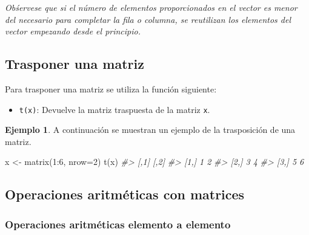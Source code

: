 \documentclass[
]{book}
\newenvironment{Shaded}{\begin{snugshade}}{\end{snugshade}}
\newcommand{\AttributeTok}[1]{\textcolor[rgb]{0.77,0.63,0.00}{#1}}
\newcommand{\CommentTok}[1]{\textcolor[rgb]{0.56,0.35,0.01}{\textit{#1}}}
\newcommand{\DecValTok}[1]{\textcolor[rgb]{0.00,0.00,0.81}{#1}}
\newcommand{\FunctionTok}[1]{\textcolor[rgb]{0.00,0.00,0.00}{#1}}
\newcommand{\NormalTok}[1]{#1}
\newcommand{\OtherTok}[1]{\textcolor[rgb]{0.56,0.35,0.01}{#1}}
\newcommand{\SpecialCharTok}[1]{\textcolor[rgb]{0.00,0.00,0.00}{#1}}
\providecommand{\tightlist}{%
  \setlength{\itemsep}{0pt}\setlength{\parskip}{0pt}}
\theoremstyle{definition}
\theoremstyle{definition}
\newtheorem{example}{Ejemplo}[chapter]
\theoremstyle{definition}
\theoremstyle{definition}
\theoremstyle{remark}
\begin{document}
\emph{Obśervese que si el número de elementos proporcionados en el vector es menor del necesario para completar la fila o columna, se reutilizan los elementos del vector empezando desde el principio.}

\hypertarget{trasponer-una-matriz}{%
\subsection{Trasponer una matriz}\label{trasponer-una-matriz}}

Para trasponer una matriz se utiliza la función siguiente:

\begin{itemize}
\tightlist
\item
  \texttt{t(x)}: Devuelve la matriz traspuesta de la matriz \texttt{x}.
\end{itemize}

\begin{example}

A continuación se muestran un ejemplo de la trasposición de una matriz.

\begin{Shaded}
\begin{Highlighting}[]
\NormalTok{x }\OtherTok{\textless{}{-}} \FunctionTok{matrix}\NormalTok{(}\DecValTok{1}\SpecialCharTok{:}\DecValTok{6}\NormalTok{, }\AttributeTok{nrow=}\DecValTok{2}\NormalTok{)}
\FunctionTok{t}\NormalTok{(x)}
\CommentTok{\#\textgreater{}      [,1] [,2]}
\CommentTok{\#\textgreater{} [1,]    1    2}
\CommentTok{\#\textgreater{} [2,]    3    4}
\CommentTok{\#\textgreater{} [3,]    5    6}
\end{Highlighting}
\end{Shaded}

\end{example}

\hypertarget{operaciones-aritmuxe9ticas-con-matrices}{%
\subsection{Operaciones aritméticas con matrices}\label{operaciones-aritmuxe9ticas-con-matrices}}

\hypertarget{operaciones-aritmuxe9ticas-elemento-a-elemento-1}{%
\subsubsection{Operaciones aritméticas elemento a elemento}\label{operaciones-aritmuxe9ticas-elemento-a-elemento-1}}
\end{document}
